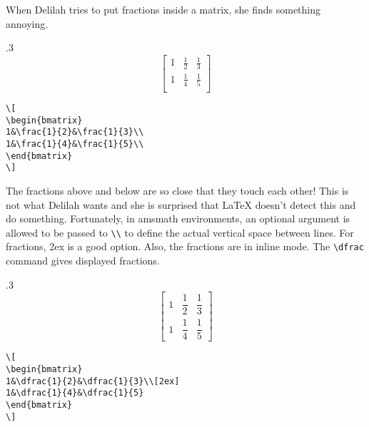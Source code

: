 When Delilah tries to put fractions inside a matrix, she finds something annoying.
\begin{miniexammar}{.3\textandmarginlen}{
\[
\begin{bmatrix}
1&\frac{1}{2}&\frac{1}{3}\\
1&\frac{1}{4}&\frac{1}{5}\\
\end{bmatrix}
\]
}
\begin{lstlisting}
\[
\begin{bmatrix}
1&\frac{1}{2}&\frac{1}{3}\\
1&\frac{1}{4}&\frac{1}{5}\\
\end{bmatrix}
\]
\end{lstlisting}
\end{miniexammar}
The fractions above and below are so close that they touch each other! This is not what Delilah wants and she is surprised that \LaTeX{} doesn't detect this and do something. Fortunately, in amsmath environments, an optional argument is allowed to be passed to \verb=\\= to define the actual vertical space between lines. For fractions, 2ex is a good option. Also, the fractions are in inline mode. The \verb=\dfrac= command gives displayed fractions.
\begin{miniexammar}{.3\textandmarginlen}{
\[
\begin{bmatrix}
1&\dfrac{1}{2}&\dfrac{1}{3}\\[2ex]
1&\dfrac{1}{4}&\dfrac{1}{5}
\end{bmatrix}
\]
}
\begin{lstlisting}
\[
\begin{bmatrix}
1&\dfrac{1}{2}&\dfrac{1}{3}\\[2ex]
1&\dfrac{1}{4}&\dfrac{1}{5}
\end{bmatrix}
\]
\end{lstlisting}
\end{miniexammar}

